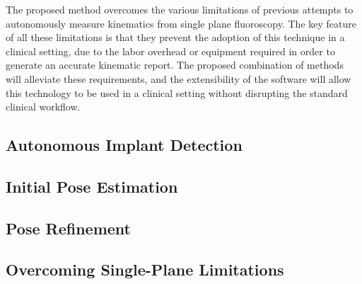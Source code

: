 The proposed method overcomes the various limitations of previous attempts to autonomously measure kinematics from single plane fluoroscopy. The key feature of all these limitations is that they prevent the adoption of this technique in a clinical setting, due to the labor overhead or equipment required in order to generate an accurate kinematic report. The proposed combination of methods will alleviate these requirements, and the extensibility of the software will allow this technology to be used in a clinical setting without disrupting the standard clinical workflow.

\subsection{Autonomous Implant Detection}
\label{sec:implant-detection}


\subsection{Initial Pose Estimation}
\label{sec:pose-estimation}


\subsection{Pose Refinement}
\label{sec:pose-refinement}


\subsection{Overcoming Single-Plane Limitations}
\label{sec:single-plane-limitations}

